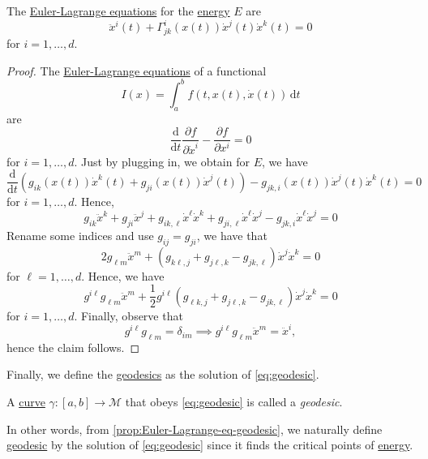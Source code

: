 \begin{proposition}\label{prop:Euler-Lagrange-eq-geodesic}
	The \href{https://en.wikipedia.org/wiki/Euler%E2%80%93Lagrange_equation}{Euler-Lagrange equations} for the \hyperref[def:energy]{energy} \(E\) are 
	\begin{equation}\label{eq:geodesic}
		\ddot{x}^i(t) + \Gamma ^{i}_{jk}(x(t)) \dot{x}^j(t)\dot{x}^k(t) = 0
	\end{equation}
	for \(i = 1, \ldots , d\).
\end{proposition}
\begin{proof}
	The \href{https://en.wikipedia.org/wiki/Euler%E2%80%93Lagrange_equation}{Euler-Lagrange equations} of a functional 
	\[
		I(x) = \int_{a}^{b} f(t, x(t), \dot{x}(t)) \,\mathrm{d}t
	\]
	are
	\[
		\frac{\mathrm{d}}{\mathrm{d}t} \frac{\partial f}{\partial \dot{x}^i} - \frac{\partial f}{\partial x^i} = 0
	\]
	for \(i = 1, \ldots , d\). Just by plugging in, we obtain for \(E\), we have
	\[
		\frac{\mathrm{d}}{\mathrm{d}t} \left( g_{ik} (x(t)) \dot{x}^k (t) + g_{ji}(x(t))\dot{x}^j(t) \right) - g_{jk, i}(x(t))\dot{x}^j(t)\dot{x}^k(t) = 0
	\]
	for \(i = 1, \ldots , d\). Hence,
	\[
		g_{ik} \ddot{x}^k + g_{ji}\ddot{x}^j + g_{ik, \ell }\dot{x}^{\ell }\dot{x}^k + g_{ji, \ell }\dot{x}^{\ell}\dot{x}^j - g_{jk, i} \dot{x}^{\ell } \dot{x}^j = 0
	\]
	Rename some indices and use \(g_{ij} = g_{ji} \), we have that
	\[
		2g_{\ell m}\ddot{x}^m + \left( g_{k \ell , j}+ g_{j \ell , k} - g_{jk, \ell} \right) \dot{x}^j \dot{x}^k = 0
	\]
	for \(\ell = 1, \ldots , d\). Hence, we have
	\[
		g^{i \ell }g_{\ell m}\ddot{x}^m + \frac{1}{2} g^{i \ell } \left( g_{\ell k, j} + g_{j \ell , k} - g_{jk, \ell } \right) \dot{x}^j \dot{x}^k = 0
	\]
	for \(i = 1, \ldots , d\). Finally, observe that
	\[
		g^{i \ell } g_{\ell m} = \delta _{im}
		\implies g^{i \ell } g_{\ell m} \ddot{x}^m = \ddot{x}^i,
	\]
	hence the claim follows.
\end{proof}

Finally, we define the \hyperref[def:geodesic]{geodesics} as the solution of \autoref{eq:geodesic}.

\begin{definition}[Geodesic]\label{def:geodesic}
	A \hyperref[def:curve]{curve} \(\gamma \colon [a, b] \to  \mathcal{M} \) that obeys \autoref{eq:geodesic} is called a \emph{geodesic}.
\end{definition}

In other words, from \autoref{prop:Euler-Lagrange-eq-geodesic}, we naturally define \hyperref[def:geodesic]{geodesic} by the solution of \autoref{eq:geodesic} since it finds the critical points of \hyperref[def:energy]{energy}.

